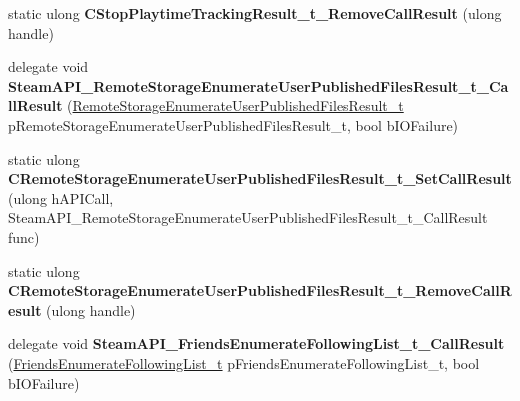 \begin{DoxyCompactItemize}
\item 
\mbox{\label{class_valve_1_1_interop_1_1_native_entrypoints_a01ed3905fa38027271c16ea3ca97cfc7}} 
static ulong {\bfseries C\+Stop\+Playtime\+Tracking\+Result\+\_\+t\+\_\+\+Remove\+Call\+Result} (ulong handle)
\item 
\mbox{\label{class_valve_1_1_interop_1_1_native_entrypoints_a28b1889e31c70ea46ebe7fea3ba905af}} 
delegate void {\bfseries Steam\+A\+P\+I\+\_\+\+Remote\+Storage\+Enumerate\+User\+Published\+Files\+Result\+\_\+t\+\_\+\+Call\+Result} (\hyperlink{struct_valve_1_1_steamworks_1_1_remote_storage_enumerate_user_published_files_result__t}{Remote\+Storage\+Enumerate\+User\+Published\+Files\+Result\+\_\+t} p\+Remote\+Storage\+Enumerate\+User\+Published\+Files\+Result\+\_\+t, bool b\+I\+O\+Failure)
\item 
\mbox{\label{class_valve_1_1_interop_1_1_native_entrypoints_a5365ab2dd03786063257e5e933ef8af3}} 
static ulong {\bfseries C\+Remote\+Storage\+Enumerate\+User\+Published\+Files\+Result\+\_\+t\+\_\+\+Set\+Call\+Result} (ulong h\+A\+P\+I\+Call, Steam\+A\+P\+I\+\_\+\+Remote\+Storage\+Enumerate\+User\+Published\+Files\+Result\+\_\+t\+\_\+\+Call\+Result func)
\item 
\mbox{\label{class_valve_1_1_interop_1_1_native_entrypoints_abd1ca8aba92a335b6073c47aa76d365d}} 
static ulong {\bfseries C\+Remote\+Storage\+Enumerate\+User\+Published\+Files\+Result\+\_\+t\+\_\+\+Remove\+Call\+Result} (ulong handle)
\item 
\mbox{\label{class_valve_1_1_interop_1_1_native_entrypoints_a2ac04c09b884c6879d9295a56a7d80eb}} 
delegate void {\bfseries Steam\+A\+P\+I\+\_\+\+Friends\+Enumerate\+Following\+List\+\_\+t\+\_\+\+Call\+Result} (\hyperlink{struct_valve_1_1_steamworks_1_1_friends_enumerate_following_list__t}{Friends\+Enumerate\+Following\+List\+\_\+t} p\+Friends\+Enumerate\+Following\+List\+\_\+t, bool b\+I\+O\+Failure)
\item 
\mbox{\label{class_valve_1_1_interop_1_1_native_entrypoints_a9d6594238615f68bc457218129473dd9}} 

\end{DoxyCompactItemize}
